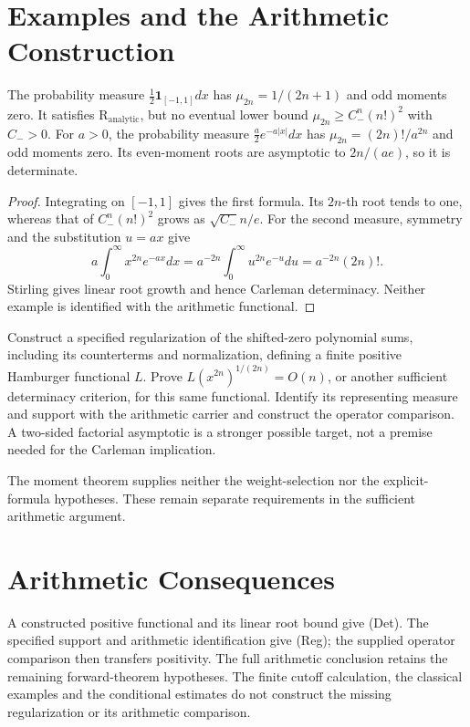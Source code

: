 \section{Examples and the Arithmetic Construction}
\label{v4-arith:r-comparison:honest-reduction}
\begin{proposition}
\label{v4-arith:r-comparison:thm:honest-reduction}
The probability measure \(\frac12\mathbf1_{[-1,1]}dx\) has
\(\mu_{2n}=1/(2n+1)\) and odd moments zero. It satisfies
\(\mathrm R_{\mathrm{analytic}}\), but no eventual lower bound
\(\mu_{2n}\geq C_-^n(n!)^2\) with \(C_->0\).
For \(a>0\), the probability measure \(\frac a2e^{-a|x|}dx\)
has \(\mu_{2n}=(2n)!/a^{2n}\) and odd moments zero. Its even-moment
roots are asymptotic to \(2n/(ae)\), so it is determinate.
\end{proposition}
\begin{proof}
Integrating on \([-1,1]\) gives the first formula. Its \(2n\)-th
root tends to one, whereas that of \(C_-^n(n!)^2\) grows as
\(\sqrt{C_-}n/e\). For the second measure, symmetry and the
substitution \(u=ax\) give
\[
 a\int_0^\infty x^{2n}e^{-ax}dx
 =a^{-2n}\int_0^\infty u^{2n}e^{-u}du=a^{-2n}(2n)!.
\]
Stirling gives linear root growth and hence Carleman determinacy.
Neither example is identified with the arithmetic functional.
\end{proof}
\begin{question}
\label{v4-arith:r-comparison:rem:what-delta-should-say}
Construct a specified regularization of the shifted-zero polynomial
sums, including its counterterms and normalization, defining a finite
positive Hamburger functional \(L\). Prove
\(L(x^{2n})^{1/(2n)}=O(n)\), or another sufficient determinacy
criterion, for this same functional. Identify its representing
measure and support with the arithmetic carrier and construct the
operator comparison. A two-sided factorial asymptotic is a stronger
possible target, not a premise needed for the Carleman implication.
\end{question}
\begin{remark}
\label{v4-arith:r-comparison:rem:not-sharpen}
The moment theorem supplies neither the weight-selection nor the
explicit-formula hypotheses. These remain separate requirements
in the sufficient arithmetic argument.
\end{remark}
\section{Arithmetic Consequences}
\label{v4-arith:r-comparison:summary}
A constructed positive functional and its linear root bound give
(Det). The specified support and arithmetic identification give
(Reg); the supplied operator comparison then transfers positivity.
The full arithmetic conclusion retains the remaining forward-theorem
hypotheses. The finite cutoff calculation, the classical examples and
the conditional estimates do not construct the missing regularization
or its arithmetic comparison.
